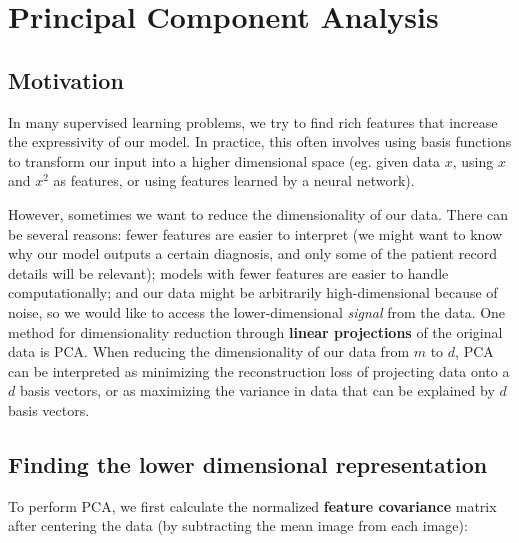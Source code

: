 \documentclass[11pt,letterpaper]{article}
\begin{document}




\section{Principal Component Analysis}

\subsection{Motivation}
In many supervised learning problems, we try to find rich features that increase the expressivity of our model. In practice, this often involves using basis functions to transform our input into a higher dimensional space (eg. given data $x$, using $x$ and $x^2$ as features, or using features learned by a neural network). 

However, sometimes we want to reduce the dimensionality of our data. There can be several reasons: fewer features are easier to interpret (we might want to know why our model outputs a certain diagnosis, and only some of the patient record details will be relevant); models with fewer features are easier to handle computationally; and our data might be arbitrarily high-dimensional because of noise, so we would like to access the lower-dimensional \emph{signal} from the data. One method for dimensionality reduction through \textbf{linear projections} of the original data is PCA. When reducing the dimensionality of our data from $m$ to $d$, PCA can be interpreted as minimizing the reconstruction loss of projecting data onto a $d$ basis vectors, or as maximizing the variance in data that can be explained by $d$ basis vectors. 

\subsection{Finding the lower dimensional representation}

To perform PCA, we first calculate the normalized \textbf{feature covariance} matrix after centering the data (by subtracting the mean image from each image):
\end{document}
